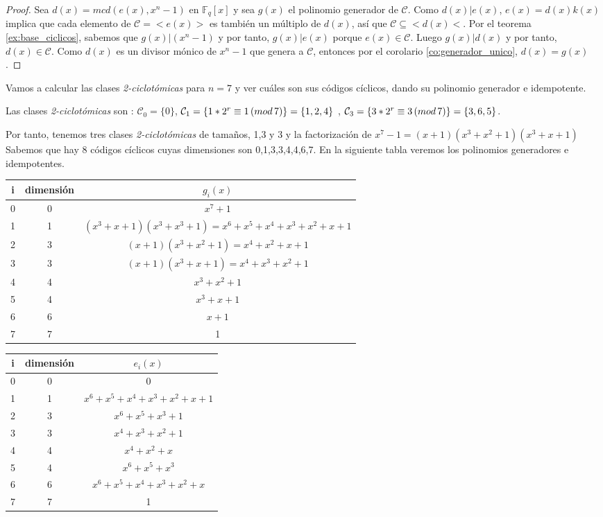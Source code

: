 \begin{proof}
Sea $d(x) = mcd(e(x),x^n-1)$ en $\mathbb{F}_q[x]$ y sea $g(x)$ el polinomio generador de $\mathcal{C}$. Como $d(x) | e(x)$, $e(x) = d(x)k(x)$ implica que cada elemento de $\mathcal{C} = < e(x) > $ es también un múltiplo de $d(x)$, así que $\mathcal{C} \subseteq <d(x)<$. Por el teorema \ref{ex:base_ciclicos}, sabemos que $g(x) | (x^n-1)$ y por tanto, $g(x) | e(x)$ porque $e(x) \in \mathcal{C}$. Luego $g(x) | d(x)$ y por tanto, $d(x) \in \mathcal{C}$. Como $d(x)$ es un divisor mónico de $x^n-1$ que genera a $\mathcal{C}$, entonces por el corolario \ref{co:generador_unico}, $d(x) = g(x)$.
\end{proof}

\begin{exampleth}
Vamos a calcular las clases \textit{2-ciclotómicas} para $n=7$ y ver cuáles son sus códigos cíclicos, dando su polinomio generador e idempotente.

Las clases \textit{2-ciclotómicas} son : $\mathcal{C}_0 = \{ 0 \} $, $\mathcal{C}_1 = \{ 1*2^r \equiv 1 \thinspace (mod \thinspace 7) \} = \{ 1,2,4 \} $ , $\mathcal{C}_3 = \{ 3*2^r \equiv 3 \thinspace (mod \thinspace 7) \} = \{ 3,6,5 \} $. 

Por tanto, tenemos tres clases \textit{2-ciclotómicas} de tamaños, 1,3 y 3 y la factorización de $x^7-1 = (x+1)(x^3+x^2+1)(x^3+x+1)$ Sabemos que hay 8 códigos cíclicos cuyas dimensiones son 0,1,3,3,4,4,6,7. En la siguiente tabla veremos los polinomios generadores e idempotentes.

 \begin{tabular}{ c | c | c | }
	i & dimensión & $g_i(x)$ \\ \hline
	0 & 0 & $ x^7 + 1$  \\
	1 & 1 & $ (x^3+x+1)(x^3+x^3+1) = x^6+x^5+x^4+x^3+x^2+x+1$  \\ 
	2 & 3 & $ (x+1)(x^3+x^2+1) = x^4+x^2+x+1$ \\
	3 & 3 & $ (x+1)(x^3+x+1) = x^4+x^3+x^2+1$  \\
	4 & 4 & $ x^3+x^2+1$  \\
	5 & 4 & $ x^3+x+1$ \\
	6 & 6 & $x+1$  \\ 
	7 & 7 & 1 

	\end{tabular}
	
	\begin{tabular}{ c | c | c |}
	i & dimensión & $e_i(x)$\\ \hline
	0 & 0  & 0 \\
	1 & 1 & $x^6+x^5+x^4+x^3+x^2+x+1$ \\ 
	2 & 3  & $x^6+x^5+x^3+1$\\
	3 & 3  &  $x^4+x^3+x^2+1$ \\
	4 & 4  & $x^4+x^2+x$ \\
	5 & 4  & $x^6+x^5+x^3$\\
	6 & 6  & $x^6+x^5+x^4+x^3+x^2+x$ \\ 
	7 & 7  & 1


\end{tabular}
\end{exampleth}
